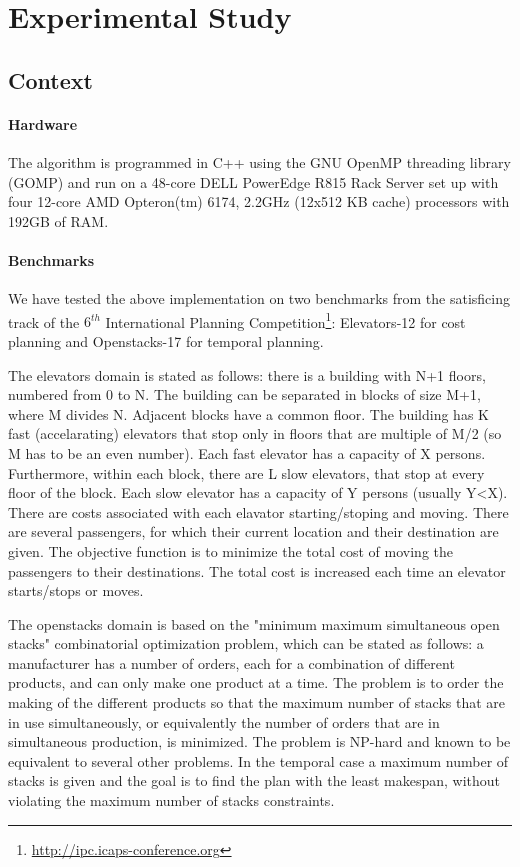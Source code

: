 \documentclass{sig-alternate}
\begin{document}
\section{Experimental Study}

\subsection{Context}

\paragraph{Hardware} %
The algorithm is programmed in C++ using the GNU OpenMP threading library (GOMP) and run on a 48-core DELL PowerEdge R815 Rack Server set up with four 12-core AMD Opteron(tm) 6174, 2.2GHz (12x512 KB cache) processors with 192GB of RAM.

\paragraph{Benchmarks} %
We have tested the above implementation on two benchmarks from the satisficing track of the $6^{th}$ International Planning Competition\footnote{\url{http://ipc.icaps-conference.org}}: Elevators-12 for cost planning and Openstacks-17 for temporal planning.

The elevators domain is stated as follows: there is a building with N+1 floors, numbered from 0 to N. The building can be separated in blocks of size M+1, where M divides N. Adjacent blocks have a common floor. The building has K fast (accelarating) elevators that stop only in floors that are multiple of M/2 (so M has to be an even number). Each fast elevator has a capacity of X persons. Furthermore, within each block, there are L slow elevators, that stop at every floor of the block. Each slow elevator has a capacity of Y persons (usually Y<X).
There are costs associated with each elavator starting/stoping and moving. There are several passengers, for which their current location and their destination are given.
The objective function is to minimize the total cost of moving the passengers to their destinations. The total cost is increased each time an elevator starts/stops or moves.

The openstacks domain is based on the "minimum maximum simultaneous open stacks" combinatorial optimization problem, which can be stated as follows: a manufacturer has a number of orders, each for a combination of different products, and can only make one product at a time. The problem is to order the making of the different products so that the maximum number of stacks that are in use simultaneously, or equivalently the number of orders that are in simultaneous production, is minimized. The problem is NP-hard and known to be equivalent to several other problems. In the temporal case a maximum number of stacks is given and the goal is to find the plan with the least makespan, without violating the maximum number of stacks constraints.
\end{document}
